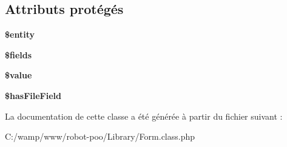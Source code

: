 \subsection*{Attributs protégés}
\begin{DoxyCompactItemize}
\item 
\hypertarget{class_library_1_1_form_a74ed34e6d7bc9f3f8c4fb58a12247ee2}{{\bfseries \$entity}}\label{class_library_1_1_form_a74ed34e6d7bc9f3f8c4fb58a12247ee2}

\item 
\hypertarget{class_library_1_1_form_ab2303c817e3b402b77b7f99627b9c319}{{\bfseries \$fields}}\label{class_library_1_1_form_ab2303c817e3b402b77b7f99627b9c319}

\item 
\hypertarget{class_library_1_1_form_a0f298096f322952a72a50f98a74c7b60}{{\bfseries \$value}}\label{class_library_1_1_form_a0f298096f322952a72a50f98a74c7b60}

\item 
\hypertarget{class_library_1_1_form_af1374f237ef60c95b46bebe40a1e1109}{{\bfseries \$has\+File\+Field}}\label{class_library_1_1_form_af1374f237ef60c95b46bebe40a1e1109}

\end{DoxyCompactItemize}


La documentation de cette classe a été générée à partir du fichier suivant \+:\begin{DoxyCompactItemize}
\item 
C\+:/wamp/www/robot-\/poo/\+Library/Form.\+class.\+php\end{DoxyCompactItemize}
